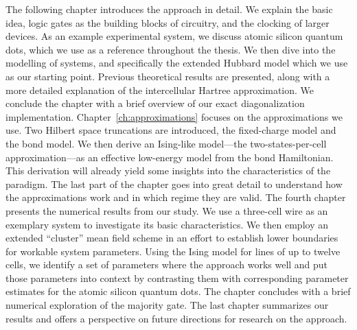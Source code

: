 The following chapter introduces the  approach in detail. We explain
the basic idea, logic gates as the building blocks of  circuitry, and
the clocking of larger devices. As an example experimental system, we discuss
atomic silicon quantum dots, which we use as a reference throughout the thesis.
We then dive into the modelling of  systems, and specifically the
extended Hubbard model which we use as our starting point. Previous theoretical
results are presented, along with a more detailed explanation of the
intercellular Hartree approximation. We conclude the chapter with a brief
overview of our exact diagonalization implementation.
Chapter~\ref{ch:approximations} focuses on the approximations we use. Two
Hilbert space truncations are introduced, the fixed-charge model and the bond
model. We then derive an Ising-like model---the two-states-per-cell
approximation---as an effective low-energy model from the bond Hamiltonian. This
derivation will already yield some insights into the characteristics of the
 paradigm. The last part of the chapter goes into great detail to
understand how the approximations work and in which regime they are valid. The
fourth chapter presents the numerical results from our study. We use a
three-cell wire as an exemplary  system to investigate its basic
characteristics. We then employ an extended ``cluster'' mean field scheme in an
effort to establish lower boundaries for workable  system parameters.
Using the Ising model for lines of up to twelve cells, we identify a set of
parameters where the  approach works well and put those parameters
into context by contrasting them with corresponding parameter estimates for the
atomic silicon quantum dots. The chapter concludes with a brief numerical
exploration of the majority gate. The last chapter summarizes our results and
offers a perspective on future directions for research on the 
approach.
